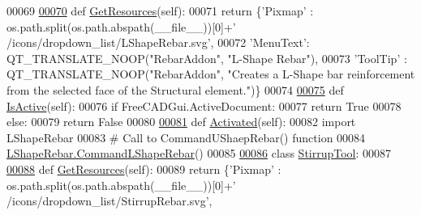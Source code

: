\begin{DoxyCode}
00069 
\hypertarget{RebarTools_8py_source.tex_l00070}{}\hyperlink{classRebarTools_1_1LShapeRebarTool_ad9298059282036c27557d881db7a05aa}{00070}     \textcolor{keyword}{def }\hyperlink{classRebarTools_1_1LShapeRebarTool_ad9298059282036c27557d881db7a05aa}{GetResources}(self):
00071         \textcolor{keywordflow}{return} \{\textcolor{stringliteral}{'Pixmap'}  : os.path.split(os.path.abspath(\_\_file\_\_))[0]+\textcolor{stringliteral}{'
      /icons/dropdown\_list/LShapeRebar.svg'},
00072                 \textcolor{stringliteral}{'MenuText'}: QT\_TRANSLATE\_NOOP(\textcolor{stringliteral}{"RebarAddon"}, \textcolor{stringliteral}{"L-Shape Rebar"}),
00073                 \textcolor{stringliteral}{'ToolTip'} : QT\_TRANSLATE\_NOOP(\textcolor{stringliteral}{"RebarAddon"}, \textcolor{stringliteral}{"Creates a L-Shape bar reinforcement from the
       selected face of the Structural element."})\}
00074 
\hypertarget{RebarTools_8py_source.tex_l00075}{}\hyperlink{classRebarTools_1_1LShapeRebarTool_ab6ecdf8b78ed418dc85af4b575b7187a}{00075}     \textcolor{keyword}{def }\hyperlink{classRebarTools_1_1LShapeRebarTool_ab6ecdf8b78ed418dc85af4b575b7187a}{IsActive}(self):
00076         \textcolor{keywordflow}{if} FreeCADGui.ActiveDocument:
00077             \textcolor{keywordflow}{return} \textcolor{keyword}{True}
00078         \textcolor{keywordflow}{else}:
00079             \textcolor{keywordflow}{return} \textcolor{keyword}{False}
00080 
\hypertarget{RebarTools_8py_source.tex_l00081}{}\hyperlink{classRebarTools_1_1LShapeRebarTool_aa3d0620b97ea017d8225c923b361d224}{00081}     \textcolor{keyword}{def }\hyperlink{classRebarTools_1_1LShapeRebarTool_aa3d0620b97ea017d8225c923b361d224}{Activated}(self):
00082         \textcolor{keyword}{import} LShapeRebar
00083         \textcolor{comment}{# Call to CommandUShaepRebar() function}
00084         \hyperlink{namespaceLShapeRebar_a5439b0c3265fa6d432d4a81e47f4441e}{LShapeRebar.CommandLShapeRebar}()
00085 
\hypertarget{RebarTools_8py_source.tex_l00086}{}\hyperlink{classRebarTools_1_1StirrupTool}{00086} \textcolor{keyword}{class }\hyperlink{classRebarTools_1_1StirrupTool}{StirrupTool}:
00087 
\hypertarget{RebarTools_8py_source.tex_l00088}{}\hyperlink{classRebarTools_1_1StirrupTool_ae5e84a5bf49fdbd2541edda370cb259f}{00088}     \textcolor{keyword}{def }\hyperlink{classRebarTools_1_1StirrupTool_ae5e84a5bf49fdbd2541edda370cb259f}{GetResources}(self):
00089         \textcolor{keywordflow}{return} \{\textcolor{stringliteral}{'Pixmap'}  : os.path.split(os.path.abspath(\_\_file\_\_))[0]+\textcolor{stringliteral}{'
      /icons/dropdown\_list/StirrupRebar.svg'},

\end{DoxyCode}
